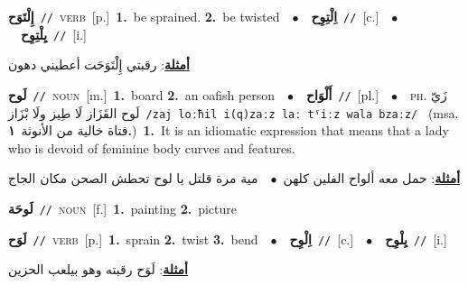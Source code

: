\documentclass[10pt,a4paper,twoside]{article} %
\begin{document}
\begin{multicols}{2}
{\setlength\topsep{0pt}\textbf{\foreignlanguage{arabic}{إِلْتَوَح}}\ {\color{gray}\texttt{//}\color{black}}\ \textsc{verb}\ [p.]\ \textbf{1.}~be sprained.  \textbf{2.}~be twisted\ \ $\bullet$\ \ \setlength\topsep{0pt}\textbf{\foreignlanguage{arabic}{اِلْتِوِح}}\ {\color{gray}\texttt{//}\color{black}}\ [c.]\ \ $\bullet$\ \ \setlength\topsep{0pt}\textbf{\foreignlanguage{arabic}{يِلْتِوِح}}\ {\color{gray}\texttt{//}\color{black}}\ [i.]\  \begin{flushright}\color{gray}\foreignlanguage{arabic}{\textbf{\underline{\foreignlanguage{arabic}{أمثلة}}}: رقبتي إِلْتَوَحَت أعطيني دهون}\end{flushright}\color{black}} \vspace{2mm}

{\setlength\topsep{0pt}\textbf{\foreignlanguage{arabic}{لَوح}}\ {\color{gray}\texttt{//}\color{black}}\ \textsc{noun}\ [m.]\ \textbf{1.}~board  \textbf{2.}~an oafish person\ \ $\bullet$\ \ \setlength\topsep{0pt}\textbf{\foreignlanguage{arabic}{أَلْوَاح}}\ {\color{gray}\texttt{//}\color{black}}\ [pl.]\ \ $\bullet$\ \ \textsc{ph.} \color{gray} \foreignlanguage{arabic}{زَيّ لَوح القَزَاز لَا طِيز ولَا بْزَاز}\color{black}\ {\color{gray}\texttt{/{\sffamily zaj loːħil i(q)zaːz laː tˤiːz wala bzaːz}/}\color{black}}\ \color{gray} (msa. \foreignlanguage{arabic}{فتاة خالية من الأنوثة}~\foreignlanguage{arabic}{\textbf{١.}})\color{black}\ \textbf{1.}~It is an idiomatic expression that means that a lady who is devoid of feminine body curves and features.\  \begin{flushright}\color{gray}\foreignlanguage{arabic}{\textbf{\underline{\foreignlanguage{arabic}{أمثلة}}}: حمل معه ألواح الفلين كلهن\ $\bullet$\ \  مية مرة قلتل يا لوح تحطش الصحن مكان الجاج}\end{flushright}\color{black}} \vspace{2mm}

{\setlength\topsep{0pt}\textbf{\foreignlanguage{arabic}{لَوحَة}}\ {\color{gray}\texttt{//}\color{black}}\ \textsc{noun}\ [f.]\ \textbf{1.}~painting  \textbf{2.}~picture\ } \vspace{2mm}

{\setlength\topsep{0pt}\textbf{\foreignlanguage{arabic}{لَوَح}}\ {\color{gray}\texttt{//}\color{black}}\ \textsc{verb}\ [p.]\ \textbf{1.}~sprain  \textbf{2.}~twist  \textbf{3.}~bend\ \ $\bullet$\ \ \setlength\topsep{0pt}\textbf{\foreignlanguage{arabic}{اِلْوِح}}\ {\color{gray}\texttt{//}\color{black}}\ [c.]\ \ $\bullet$\ \ \setlength\topsep{0pt}\textbf{\foreignlanguage{arabic}{يِلْوِح}}\ {\color{gray}\texttt{//}\color{black}}\ [i.]\  \begin{flushright}\color{gray}\foreignlanguage{arabic}{\textbf{\underline{\foreignlanguage{arabic}{أمثلة}}}: لَوَح رقبته وهو بيلعب الحزين}\end{flushright}\color{black}} \vspace{2mm}


\end{multicols}
\end{document}
